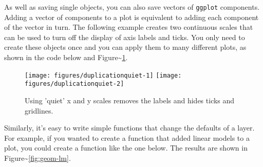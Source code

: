 As well as saving single objects, you can also save vectors of
\texttt{ggplot} components. Adding a vector of components to a plot is
equivalent to adding each component of the vector in turn. The following
example creates two continuous scales that can be used to turn off the
display of axis labels and ticks. You only need to create these objects
once and you can apply them to many different plots, as shown in the
code below and Figure\textasciitilde{}\ref{fig:quiet}.

\begin{Shaded}
\begin{Highlighting}[]
\StringTok{ }\NormalTok{(} \NormalTok{)}
\StringTok{ }\NormalTok{(} \NormalTok{)}

 \StringTok{ }
 \StringTok{ }\StringTok{ }
\end{Highlighting}
\end{Shaded}

\begin{figure}
\texttt{[image: figures/duplicationquiet-1]} \texttt{[image: figures/duplicationquiet-2]} \caption{Using 'quiet' x and y scales removes the labels and hides ticks and gridlines.\label{fig:quiet}}
\end{figure}

Similarly, it's easy to write simple functions that change the defaults
of a layer. For example, if you wanted to create a function that added
linear models to a plot, you could create a function like the one below.
The results are shown in Figure\textasciitilde{}\ref{fig:geom-lm}.

\begin{Shaded}
\begin{Highlighting}[]
\StringTok{ } \StringTok{ }
  \NormalTok{(}  \NormalTok{, } \NormalTok{)}
\NormalTok{\}}
 \StringTok{ }\NormalTok{()}
\NormalTok{(}\NormalTok{)}
 \StringTok{ }\StringTok{ }\NormalTok{))}
\end{Highlighting}
\end{Shaded}

